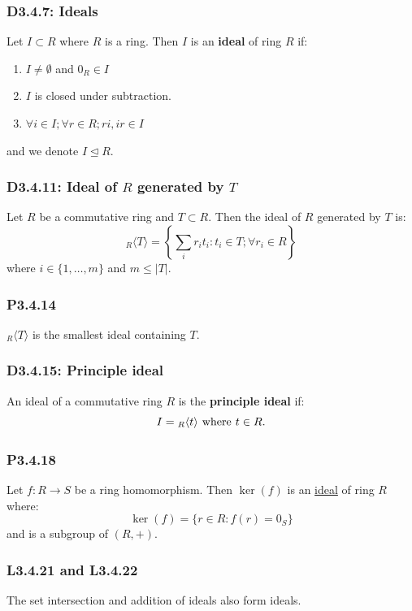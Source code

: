 \documentclass{article}
\begin{document}
\begin{multicols*}{3}
\subsubsection*{D3.4.7: Ideals}
Let $I\subset R$ where $R$ is a ring. Then
$I$ is an \textbf{ideal} of ring $R$ if:
\begin{enumerate}
    \item $I\neq\emptyset$ and $0_R\in I$
    \item $I$ is closed under subtraction.
    \item $\forall i\in I;\forall r\in R;
    ri,ir\in I$
\end{enumerate}
and we denote $I\trianglelefteq R$.

\subsubsection*{D3.4.11: Ideal of $R$ generated by $T$}
Let $R$ be a commutative ring and $T\subset R$.
Then the ideal of $R$ generated by $T$ is:
$${}_R\langle T\rangle=\left\{\sum_i r_i t_i
:t_i\in T;\forall r_i\in R\right\}$$
where $i\in\{1,\dots,m\}$ and $m\leq|T|$.

\subsubsection*{P3.4.14}
${}_R\langle T\rangle$ is the smallest ideal
containing $T$.

\subsubsection*{D3.4.15: Principle ideal}
An ideal of a commutative ring $R$ is the
\textbf{principle ideal} if:
$$I={}_R\langle t\rangle\hspace{0.05in}\text{where}
\hspace{0.05in}t\in R.$$

\subsubsection*{P3.4.18}
Let $f:R\rightarrow S$ be a ring homomorphism.
Then $\ker(f)$ is an \underline{ideal} of ring $R$ where:
$$\ker(f)=\{r\in R:f(r)=0_S\}$$
and is a subgroup of $(R,+)$.

\subsubsection*{L3.4.21 and L3.4.22}
The set intersection and addition of ideals also form ideals.


\end{multicols*}
\end{document}
